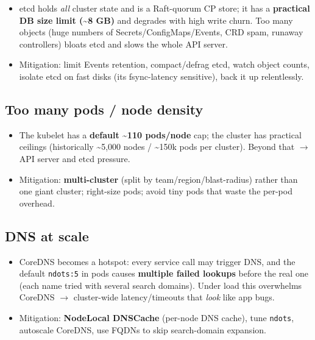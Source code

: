 \documentclass[11pt]{article}
\providecommand{\tightlist}{\setlength{\itemsep}{1pt}\setlength{\parskip}{0pt}}
\begin{document}
\begin{itemize}
\tightlist
\item
  etcd holds \emph{all} cluster state and is a Raft-quorum CP store; it has a \textbf{practical DB size limit (\textasciitilde8 GB)} and degrades with high write churn. Too many objects (huge numbers of Secrets/ConfigMaps/Events, CRD spam, runaway controllers) bloats etcd and slows the whole API server.
\item
  Mitigation: limit Events retention, compact/defrag etcd, watch object counts, isolate etcd on fast disks (it\textquotesingle s fsync-latency sensitive), back it up relentlessly.
\end{itemize}

\subsection{Too many pods / node density}\label{too-many-pods--node-density}

\begin{itemize}
\tightlist
\item
  The kubelet has a \textbf{default \textasciitilde110 pods/node} cap; the cluster has practical ceilings (historically \textasciitilde5,000 nodes / \textasciitilde150k pods per cluster). Beyond that \(\rightarrow\) API server and etcd pressure.
\item
  Mitigation: \textbf{multi-cluster} (split by team/region/blast-radius) rather than one giant cluster; right-size pods; avoid tiny pods that waste the per-pod overhead.
\end{itemize}

\subsection{DNS at scale}\label{dns-at-scale}

\begin{itemize}
\tightlist
\item
  CoreDNS becomes a hotspot: every service call may trigger DNS, and the default \texttt{ndots:5} in pods causes \textbf{multiple failed lookups} before the real one (each name tried with several search domains). Under load this overwhelms CoreDNS \(\rightarrow\) cluster-wide latency/timeouts that \emph{look} like app bugs.
\item
  Mitigation: \textbf{NodeLocal DNSCache} (per-node DNS cache), tune \texttt{ndots}, autoscale CoreDNS, use FQDNs to skip search-domain expansion.
\end{itemize}
\end{document}

